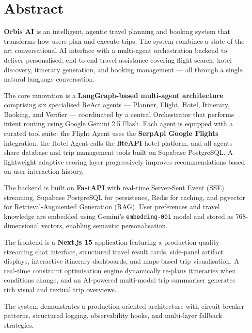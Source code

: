 \documentclass[12pt, a4paper]{article}
\begin{document}
\newpage
{}
\section*{Abstract}

\textbf{Orbis AI} is an intelligent, agentic travel planning and booking system that transforms how users plan and execute trips. The system combines a state-of-the-art conversational AI interface with a multi-agent orchestration backend to deliver personalised, end-to-end travel assistance covering flight search, hotel discovery, itinerary generation, and booking management — all through a single natural language conversation.

The core innovation is a \textbf{LangGraph-based multi-agent architecture} comprising six specialised ReAct agents --- Planner, Flight, Hotel, Itinerary, Booking, and Verifier --- coordinated by a central Orchestrator that performs intent routing using Google Gemini 2.5 Flash. Each agent is equipped with a curated tool suite: the Flight Agent uses the \textbf{SerpApi Google Flights} integration, the Hotel Agent calls the \textbf{liteAPI} hotel platform, and all agents share database and trip management tools built on Supabase PostgreSQL. A lightweight adaptive scoring layer progressively improves recommendations based on user interaction history.

The backend is built on \textbf{FastAPI} with real-time Server-Sent Event (SSE) streaming, Supabase PostgreSQL for persistence, Redis for caching, and pgvector for Retrieval-Augmented Generation (RAG). User preferences and travel knowledge are embedded using Gemini's \texttt{embedding-001} model and stored as 768-dimensional vectors, enabling semantic personalisation.

The frontend is a \textbf{Next.js 15} application featuring a production-quality streaming chat interface, structured travel result cards, side-panel artifact displays, interactive itinerary dashboards, and maps-based trip visualisation. A real-time constraint optimisation engine dynamically re-plans itineraries when conditions change, and an AI-powered multi-modal trip summariser generates rich visual and textual trip overviews.

The system demonstrates a production-oriented architecture with circuit breaker patterns, structured logging, observability hooks, and multi-layer fallback strategies.
\end{document}
